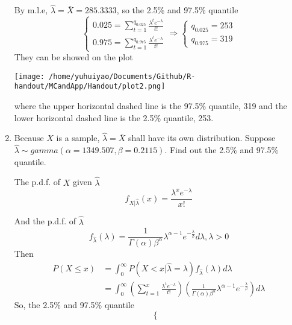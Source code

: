 \begin{enumerate}
	By m.l.e, $\hat{\lambda} = \bar{X} = 285.3333$, so the 2.5\% and 97.5\% quantile
	\begin{equation*}
		\begin{cases}
			0.025 = \sum_{t = 1}^{q_{0.025}}\frac{\lambda^{t}e^{-\lambda}}{t!} \\
			0.975 = \sum_{t = 1}^{q_{0.975}}\frac{\lambda^{t}e^{-\lambda}}{t!} 
		\end{cases} \Rightarrow \begin{cases}
			q_{0.025} = 253 \\
			q_{0.975} = 319
		\end{cases}
	\end{equation*}
	They can be showed on the plot
	\begin{center}
		\texttt{[image: /home/yuhuiyao/Documents/Github/R-handout/MCandApp/Handout/plot2.png]}
	\end{center}
	where the upper horizontal dashed line is the 97.5\% quantile, 319 and the lower horizontal dashed line is the 2.5\% quantile, 253.
	\item Because $X$ is a sample, $\hat{\lambda} = \bar{X}$ shall have its own distribution. Suppose $\hat{\lambda} \sim gamma(\alpha= 1349.507, \beta = 0.2115)$. Find out the 2.5\% and 97.5\% quantile.
	\par The p.d.f. of $X$ given $\hat{\lambda}$
	\begin{equation*}
			f_{X|\hat{\lambda}}(x) = \frac{\lambda^{x}e^{-\lambda}}{x!}
	\end{equation*}
	\par And the p.d.f. of $\hat{\lambda}$
	\begin{equation*}
		f_{\hat{\lambda}}(\lambda) = \frac{1}{\Gamma(\alpha)\beta^{\alpha}}\lambda^{\alpha - 1}e^{-\frac{\lambda}{\beta}}d\lambda, \lambda > 0
	\end{equation*}
	Then
	\begin{equation*}
		\begin{split}
			P(X \le x) &= \int_{0}^{\infty}P(X < x | \hat{\lambda} = \lambda)f_{\hat{\lambda}}(\lambda) d \lambda \\
			& = \int_{0}^{\infty}(\sum_{t = 1}^{x}\frac{\lambda^{t}e^{-\lambda}}{t!})(\frac{1}{\Gamma(\alpha)\beta^{\alpha}}\lambda^{\alpha - 1}e^{-\frac{\lambda}{\beta}}) d \lambda
		\end{split}
	\end{equation*}
	So, the 2.5\% and 97.5\% quantile
	\begin{equation*}
		\begin{cases}

\end{cases}
\end{equation*}
\end{enumerate}
